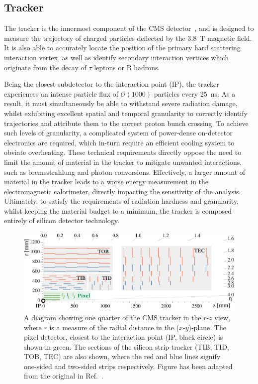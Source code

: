 \subsection{Tracker}\label{sec:cms_tracker}
The tracker is the innermost component of the CMS detector~\cite{Chatrchyan:2008zzk,Chatrchyan:2014fea}, and is designed to measure the trajectory of charged particles deflected by the 3.8~T magnetic field. It is also able to accurately locate the position of the primary hard scattering interaction vertex, as well as identify secondary interaction vertices which originate from the decay of $\tau$ leptons or B hadrons. 

Being the closest subdetector to the interaction point (IP), the tracker experiences an intense particle flux of $\mathcal{O}(1000)$ particles every 25~ns. As a result, it must simultaneously be able to withstand severe radiation damage, whilst exhibiting excellent spatial and temporal granularity to correctly identify trajectories and attribute them to the correct proton bunch crossing. To achieve such levels of granularity, a complicated system of power-dense on-detector electronics are required, which in-turn require an efficient cooling system to obviate overheating. These technical requirements directly oppose the need to limit the amount of material in the tracker to mitigate unwanted interactions, such as bremsstrahlung and photon conversions. Effectively, a larger amount of material in the tracker leads to a worse energy measurement in the electromagnetic calorimeter, directly impacting the sensitivity of the \Hgg analysis. Ultimately, to satisfy the requirements of radiation hardness and granularity, whilst keeping the material budget to a minimum, the tracker is composed entirely of silicon detector technology.

\begin{figure}[htb!]
  \centering
  \includegraphics[width=1\textwidth]{Figures/cms/tracker.pdf}
  \caption[The CMS silicon tracker]
  {
    A diagram showing one quarter of the CMS tracker in the $r$-$z$ view, where $r$ is a measure of the radial distance in the ($x$-$y$)-plane. The pixel detector, closest to the interaction point (IP, black circle) is shown in green. The sections of the silicon strip tracker (TIB, TID, TOB, TEC) are also shown, where the red and blue lines signify one-sided and two-sided strips respectively. Figure has been adapted from the original in Ref.~\cite{CERN-LHCC-2017-009}.
  }
  \label{fig:cms_tracker}
\end{figure}

